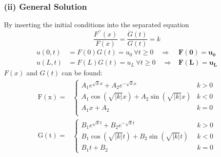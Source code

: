 \subsubsection{(ii) General Solution}
By inserting the initial conditions into the separated equation
\begin{equation*}
    \frac{F^{\prime\prime}(x)}{F(x)}=\frac{\ddot{G}(t)}{G(t)}=k
\end{equation*}
\begin{align*}
    u(0,t) & =F(0)G(t)=u_0\mathrm{~}\forall t\geq0\quad\Rightarrow & \mathbf{F(0)}=\mathbf{u_0} \\
    u(L,t) & =F(L)G(t)=u_L\mathrm{~}\forall t\geq0\quad\Rightarrow & \mathbf{F(L)}=\mathbf{u_L}
\end{align*}
$F(x)$ and $G(t)$ can be found:
\begin{align*}
    \mathrm{F(x)}= &
    \begin{cases}
        A_1e^{\sqrt{k}x}+A_2e^{-\sqrt{k}x}        & k>0 \\
        A_1\cos(\sqrt{|k|}x)+A_2\sin(\sqrt{|k|}x) & k<0 \\
        A_1x+A_2                                  & k=0 \\
    \end{cases} \\
    \mathrm{G(t)}= &
    \begin{cases}
        B_1e^{\sqrt{k}t}+B_2e^{-\sqrt{k}t}        & \;\,k>0 \\
        B_1\cos(\sqrt{|k|}t)+B_2\sin(\sqrt{|k|}t) & \;\,k<0 \\
        B_1t+B_2                                  & \;\,k=0
    \end{cases}
\end{align*}
%
%
